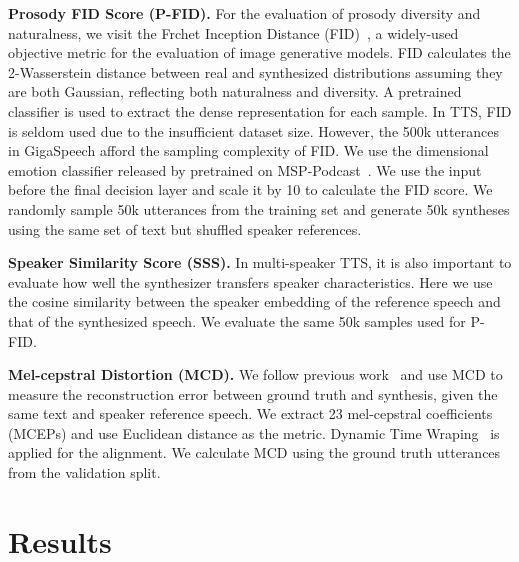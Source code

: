 \documentclass[letterpaper]{article} %
\begin{document}
\textbf{Prosody FID Score (P-FID).}
For the evaluation of prosody diversity and naturalness, we visit the Frchet Inception Distance (FID)~\cite{NIPS2017_8a1d6947}, a widely-used objective metric for the evaluation of image generative models.
FID calculates the 2-Wasserstein distance between real and synthesized distributions assuming they are both Gaussian, reflecting both naturalness and diversity.
A pretrained classifier is used to extract the dense representation for each sample.
In TTS, FID is seldom used due to the insufficient dataset size.
However, the 500k utterances in GigaSpeech afford the sampling complexity of FID.
We use the dimensional emotion classifier released by \cite{https://doi.org/10.48550/arxiv.2203.07378} pretrained on MSP-Podcast~\cite{Lotfian_2019_3}.
We use the input before the final decision layer and scale it by 10 to calculate the FID score.
We randomly sample 50k utterances from the training set and generate 50k syntheses using the same set of text but shuffled speaker references.

\textbf{Speaker Similarity Score (SSS).}
In multi-speaker TTS, it is also important to evaluate how well the synthesizer transfers speaker characteristics.
Here we use the cosine similarity between the speaker embedding of the reference speech and that of the synthesized speech.
We evaluate the same 50k samples used for P-FID.

\textbf{Mel-cepstral Distortion (MCD).}
We follow previous work~\cite{DBLP:journals/corr/abs-2110-07840} and use MCD to measure the reconstruction error between ground truth and synthesis, given the same text and speaker reference speech.
We extract 23 mel-cepstral coefficients (MCEPs) and use Euclidean distance as the metric.
Dynamic Time Wraping~\cite{dtw} is applied for the alignment.
We calculate MCD using the ground truth utterances from the validation split.


\section{Results}
\label{sec:res}
\end{document}
